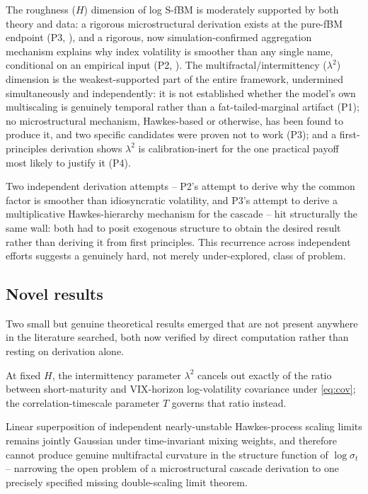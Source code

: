 \documentclass[11pt]{article}
\begin{document}
\begin{finding}
The roughness ($H$) dimension of log S-fBM is moderately supported by both theory and data: a rigorous microstructural derivation exists at the pure-fBM endpoint (P3, \citealp{eleuch2018microstructural}), and a rigorous, now simulation-confirmed aggregation mechanism explains why index volatility is smoother than any single name, conditional on an empirical input (P2, \citealp{zarhali2025nested}). The multifractal/intermittency ($\lambda^2$) dimension is the weakest-supported part of the entire framework, undermined simultaneously and independently: it is not established whether the model's own multiscaling is genuinely temporal rather than a fat-tailed-marginal artifact (P1); no microstructural mechanism, Hawkes-based or otherwise, has been found to produce it, and two specific candidates were proven not to work (P3); and a first-principles derivation shows $\lambda^2$ is calibration-inert for the one practical payoff most likely to justify it (P4).
\end{finding}

Two independent derivation attempts -- P2's attempt to derive why the common factor is smoother than idiosyncratic volatility, and P3's attempt to derive a multiplicative Hawkes-hierarchy mechanism for the cascade -- hit structurally the same wall: both had to posit exogenous structure to obtain the desired result rather than deriving it from first principles. This recurrence across independent efforts suggests a genuinely hard, not merely under-explored, class of problem.

\subsection{Novel results}

Two small but genuine theoretical results emerged that are not present anywhere in the literature searched, both now verified by direct computation rather than resting on derivation alone.

\begin{theorem}[P4]
At fixed $H$, the intermittency parameter $\lambda^2$ cancels out exactly of the ratio between short-maturity and VIX-horizon log-volatility covariance under \eqref{eq:cov}; the correlation-timescale parameter $T$ governs that ratio instead.
\end{theorem}

\begin{theorem}[P3]
Linear superposition of independent nearly-unstable Hawkes-process scaling limits remains jointly Gaussian under time-invariant mixing weights, and therefore cannot produce genuine multifractal curvature in the structure function of $\log\sigma_t$ -- narrowing the open problem of a microstructural cascade derivation to one precisely specified missing double-scaling limit theorem.
\end{theorem}
\end{document}
